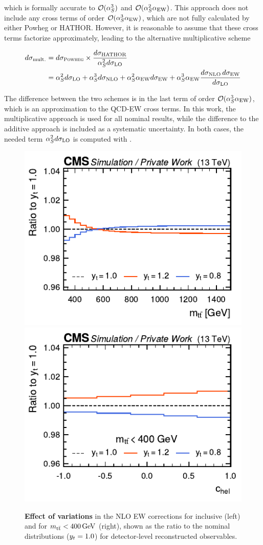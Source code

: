 \noindent which is formally accurate to $\mathcal{O}(\alpha_S^3)$ and $\mathcal{O}(\alpha_S^2 \alpha_{\mathrm{EW}})$. This approach does not include any cross terms of order $\mathcal{O}(\alpha_S^3 \alpha_{\mathrm{EW}})$, which are not fully calculated by either Powheg or HATHOR. However, it is reasonable to assume that these cross terms factorize approximately, leading to the alternative multiplicative scheme~\cite{Kuhn:2013zoa}

\begin{equation}
\begin{split}
\label{eq:ah:ewmult}
    d \sigma_{\mathrm{mult.}} &= d \sigma_{\textsc{Powheg}} \times \frac{d \sigma_{\mathrm{HATHOR}}} {\alpha_S^2 d \sigma_{\mathrm{LO}}} \\
    &= \alpha_S^2 d \sigma_{\mathrm{LO}} + \alpha_S^3 d \sigma_{\mathrm{NLO}} + \alpha_S^2 \alpha_{\mathrm{EW}} d \sigma_{\mathrm{EW}} + \alpha_S^3 \alpha_{\mathrm{EW}} \frac {d \sigma_{\mathrm{NLO}} \, d \sigma_{\mathrm{EW}}}{d \sigma_{\mathrm{LO}}}
\end{split}
\end{equation}

The difference between the two schemes is in the last term of order $\mathcal{O}(\alpha_S^3\alpha_{\mathrm{EW}})$, which is an approximation to the QCD-EW cross terms. In this work, the multiplicative approach is used for all nominal results, while the difference to the additive approach is included as a systematic uncertainty. In both cases, the needed term $\alpha_S^2 d \sigma_{\mathrm{LO}}$ is computed with \amcatnlo.

\begin{figure}[t]
    \centering
    \includegraphics[width=0.49\linewidth]{figures/ah/ewqcdcorrs_yt_mtt.pdf}
    \hfill
    \includegraphics[width=0.49\linewidth]{figures/ah/ewqcdcorrs_yt_chel.pdf}
    \caption{\textbf{Effect of \yt variations} in the NLO EW corrections for inclusive \mtt (left) and \chel for $\mtt < \SI{400}{\GeV}$ (right), shown as the ratio to the nominal distributions ($y_t = 1.0$) for detector-level reconstructed observables.}
    \label{fig:ah:yt_variation}
\end{figure}

